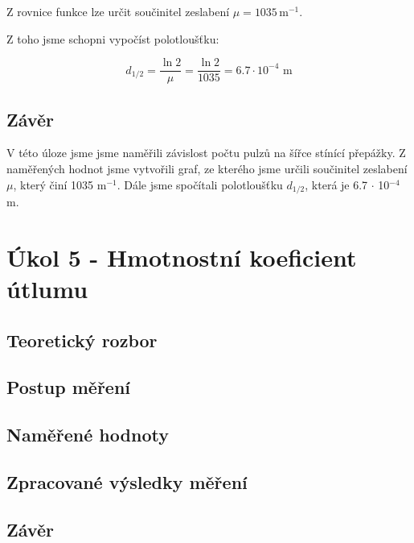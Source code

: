 \documentclass{protokol}
\begin{document}
    
    \begin{flushleft}
    Z rovnice funkce lze určit součinitel zeslabení $\mu = 1035 \, \text{m}^{-1}$.
    \end{flushleft}
    
    \begin{flushleft}
        Z toho jsme schopni vypočíst polotloušťku:
    \end{flushleft}

        \begin{equation}
        d_{1/2} =  \dfrac{\ln{2}}{\mu} = \dfrac{\ln{2}}{1035} = 6.7 \cdot 10^{-4} \text{ m}
        \end{equation}
    


    \subsection{Závěr}

    V této úloze jsme jsme naměřili závislost počtu pulzů na šířce stínící přepážky. Z naměřených hodnot jsme vytvořili graf, ze kterého jsme určili součinitel zeslabení $\mu$, který činí 1035 m$^{-1}$. Dále jsme spočítali polotloušťku $d_{1/2}$, která je 6.7 $\cdot$ 10$^{-4}$ m.

\pagebreak

\section{Úkol 5 - Hmotnostní koeficient útlumu}
    \subsection{Teoretický rozbor}
    \subsection{Postup měření}
    \subsection{Naměřené hodnoty}   
    \subsection{Zpracované výsledky měření}
    \subsection{Závěr}
\end{document}
